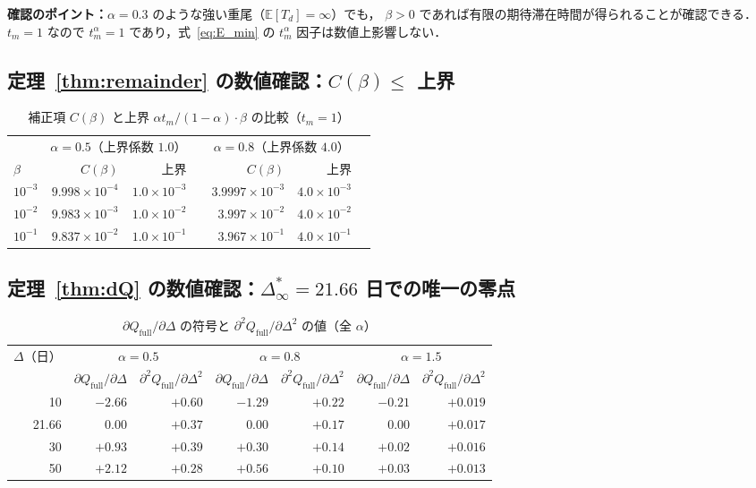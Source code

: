 \documentclass[12pt,a4paper]{article}
\theoremstyle{plain}
\theoremstyle{definition}
\theoremstyle{remark}
\newcommand{\E}{\mathbb{E}}
\newcommand{\Qf}{Q_{\mathrm{full}}}
\newcommand{\Dinf}{\Delta^{*}_{\infty}}
\begin{document}
\noindent
\textbf{確認のポイント：}$\alpha=0.3$ のような強い重尾（$\E[T_d]=\infty$）でも，
$\beta>0$ であれば有限の期待滞在時間が得られることが確認できる．
$t_m=1$ なので $t_m^\alpha=1$ であり，式~\eqref{eq:E_min} の $t_m^\alpha$ 因子は数値上影響しない．

\subsection{定理~\ref{thm:remainder} の数値確認：$C(\beta)\le$ 上界}

\begin{table}[h]
\centering
\caption{補正項 $C(\beta)$ と上界 $\alpha t_m/(1-\alpha)\cdot\beta$ の比較（$t_m=1$）}
\label{tab:remainder}
\begin{tabular}{@{}lrrlrrl@{}}
\toprule
& \multicolumn{2}{c}{$\alpha=0.5$（上界係数 $1.0$）} &&
\multicolumn{2}{c}{$\alpha=0.8$（上界係数 $4.0$）}\\
\cmidrule{2-3}\cmidrule{5-6}
$\beta$ & $C(\beta)$ & 上界 && $C(\beta)$ & 上界 \\
\midrule
$10^{-3}$ & $9.998\times10^{-4}$ & $1.0\times10^{-3}$ &&
$3.9997\times10^{-3}$ & $4.0\times10^{-3}$ \\
$10^{-2}$ & $9.983\times10^{-3}$ & $1.0\times10^{-2}$ &&
$3.997\times10^{-2}$ & $4.0\times10^{-2}$ \\
$10^{-1}$ & $9.837\times10^{-2}$ & $1.0\times10^{-1}$ &&
$3.967\times10^{-1}$ & $4.0\times10^{-1}$ \\
\bottomrule
\end{tabular}
\end{table}

\subsection{定理~\ref{thm:dQ} の数値確認：$\Dinf=21.66$ 日での唯一の零点}

\begin{table}[h]
\centering
\caption{$\partial\Qf/\partial\Delta$ の符号と $\partial^2\Qf/\partial\Delta^2$ の値（全 $\alpha$）}
\label{tab:dQ}
\begin{tabular}{@{}rrrrrrr@{}}
\toprule
\multirow{2}{*}{$\Delta$（日）} &
\multicolumn{2}{c}{$\alpha=0.5$} &
\multicolumn{2}{c}{$\alpha=0.8$} &
\multicolumn{2}{c}{$\alpha=1.5$} \\
\cmidrule{2-3}\cmidrule{4-5}\cmidrule{6-7}
& $\partial\Qf/\partial\Delta$ & $\partial^2\Qf/\partial\Delta^2$ &
$\partial\Qf/\partial\Delta$ & $\partial^2\Qf/\partial\Delta^2$ &
$\partial\Qf/\partial\Delta$ & $\partial^2\Qf/\partial\Delta^2$ \\
\midrule
10    & $-2.66$ & $+0.60$ & $-1.29$ & $+0.22$ & $-0.21$ & $+0.019$ \\
21.66 & $0.00$  & $+0.37$ & $0.00$  & $+0.17$ & $0.00$  & $+0.017$ \\
30    & $+0.93$ & $+0.39$ & $+0.30$ & $+0.14$ & $+0.02$ & $+0.016$ \\
50    & $+2.12$ & $+0.28$ & $+0.56$ & $+0.10$ & $+0.03$ & $+0.013$ \\
\bottomrule
\end{tabular}
\end{table}
\end{document}
